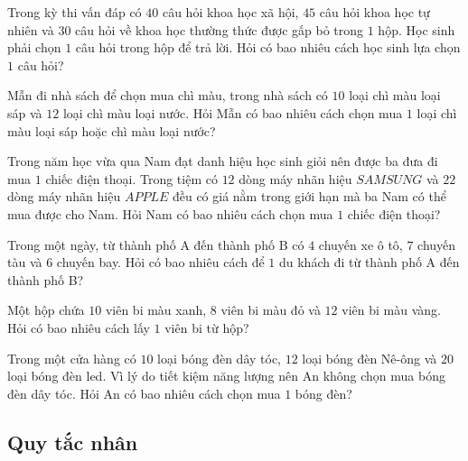 \begin{bt}%
Trong kỳ thi vấn đáp có $40$ câu hỏi khoa học xã hội, $45$ câu hỏi khoa học tự nhiên và $30$ câu hỏi về khoa học thường thức được gấp bỏ trong $1$ hộp. Học sinh phải chọn $1$ câu hỏi trong hộp để trả lời. Hỏi có bao nhiêu cách học sinh lựa chọn $1$ câu hỏi?
\end{bt}

\begin{bt}%
Mẫn đi nhà sách để chọn mua chì màu, trong nhà sách có $10$ loại chì màu loại sáp và $12$ loại chì màu loại nước. Hỏi Mẫn có bao nhiêu cách chọn mua $1$ loại chì màu loại sáp hoặc chì màu loại nước?
\end{bt}

\begin{bt}%
Trong năm học vừa qua Nam đạt danh hiệu học sinh giỏi nên được ba đưa đi mua $1$ chiếc điện thoại. Trong tiệm có $12$ dòng máy nhãn hiệu $SAMSUNG$ và $22$ dòng máy nhãn hiệu $APPLE$ đều có giá nằm trong giới hạn mà ba Nam có thể mua được cho Nam. Hỏi Nam có bao nhiêu cách chọn  mua $1$ chiếc điện thoại?
\end{bt}

\begin{bt}%
Trong một ngày, từ thành phố A đến thành phố B có $4$ chuyến xe ô tô, $7$ chuyến tàu và $6$ chuyến bay. Hỏi có bao nhiêu cách để $1$ du khách đi từ thành phố A đến thành phố B?
\end{bt}

\begin{bt}%
Một hộp chứa $10$ viên bi màu xanh, $8$ viên bi màu đỏ và $12$ viên bi màu vàng. Hỏi có bao nhiêu cách lấy $1$ viên bi từ hộp?
\end{bt}

\begin{bt}%
Trong một cửa hàng có $10$ loại bóng đèn dây tóc, $12$ loại bóng đèn Nê-ông và $20$ loại bóng đèn led. Vì lý do tiết kiệm năng lượng nên An không chọn mua bóng đèn dây tóc. Hỏi An có bao nhiêu cách chọn mua $1$ bóng đèn?
\end{bt}


\subsection{Quy tắc nhân}
